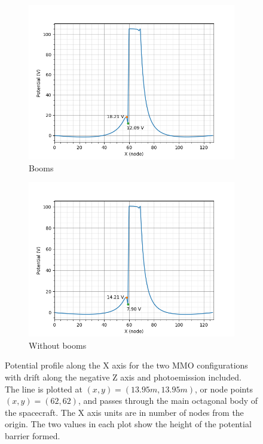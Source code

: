 \begin{figure}[H]
  \begin{subfigure}[b]{0.6\textwidth}
  \includegraphics[width=\textwidth]{figures/MMO/minZ/WB/L_minZ_WB.png}
  \caption{Booms}
  \label{fig:L_minZ_WB}
\end{subfigure}
\begin{subfigure}[b]{0.6\textwidth}
  \includegraphics[width=\textwidth]{figures/MMO/minZ/NB/L_minZ_NB.png}
  \caption{Without booms}
  \label{fig:L_minZ_N}
\end{subfigure}
\label{fig:Line_minZ}
\caption{Potential profile along the X axis for the two MMO configurations with drift along the negative Z axis and photoemission included. The line is plotted at $(x,y) = (13.95 m, 13.95 m)$, or node points $(x,y) = (62,62)$, and passes through the main octagonal body of the spacecraft. The X axis units are in number of nodes from the origin. The two values in each plot show the height of the potential barrier formed.}
\end{figure}


